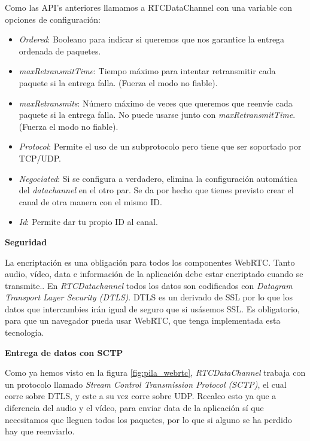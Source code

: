 \noindent Como las API's anteriores llamamos a RTCDataChannel con una variable con opciones de configuración:

\begin{itemize}
\item \emph{Ordered}: Booleano para indicar si queremos que nos garantice la entrega ordenada de paquetes.
\item \emph{maxRetransmitTime}: Tiempo máximo para intentar retransmitir cada paquete si la entrega falla. (Fuerza el modo no fiable).
\item \emph{maxRetransmits}: Número máximo de veces que queremos que reenvíe cada paquete si la entrega falla. No puede usarse junto con \textit{maxRetransmitTime}. (Fuerza el modo no fiable).
\item \emph{Protocol}: Permite el uso de un subprotocolo pero tiene que ser soportado por TCP/UDP.
\item \emph{Negociated}: Si se configura a verdadero, elimina la configuración automática del \emph{datachannel} en el otro par. Se da por hecho que tienes previsto crear el canal de otra manera con el mismo ID.
\item \emph{Id}: Permite dar tu propio ID al canal.
\end{itemize}

\begin{normalsize}
\noindent \textbf{Seguridad}\\
\end{normalsize}

La encriptación es una obligación para todos los componentes WebRTC. Tanto audio, vídeo, data e información de la aplicación debe estar encriptado cuando se transmite.. En \emph{RTCDatachannel} todos los datos son codificados con \textit{Datagram Transport Layer Security (DTLS)}. DTLS es un derivado de SSL por lo que los datos que intercambies irán igual de seguro que si usásemos SSL. Es obligatorio, para que un navegador pueda usar WebRTC, que tenga implementada esta tecnología.\\


\begin{normalsize}
\noindent \textbf{Entrega de datos con SCTP}\\
\end{normalsize}

Como ya hemos visto en la figura \ref{fig:pila_webrtc}, \emph{RTCDataChannel} trabaja con un protocolo llamado \textit{Stream Control Transmission Protocol (SCTP)}, el cual corre sobre DTLS, y este a su vez corre sobre UDP. Recalco esto ya que a diferencia del audio y el vídeo, para enviar data de la aplicación sí que necesitamos que lleguen todos los paquetes, por lo que si alguno se ha perdido hay que reenviarlo.\\

